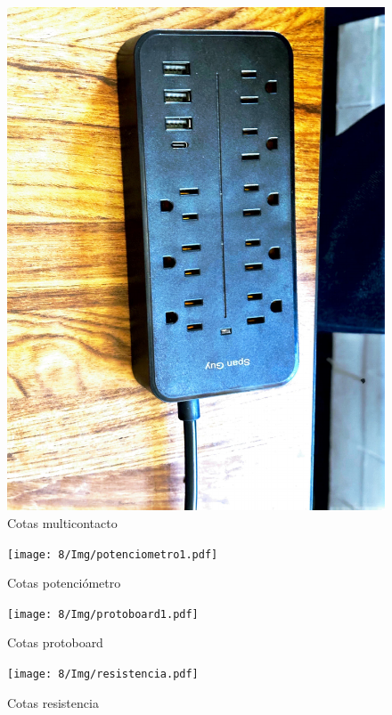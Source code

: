     
    \begin{figure}[H]
        \centering
        \includegraphics[trim = {1mm 1mm 1mm 1mm},clip,scale=0.3]{8/Img/multicontacto.pdf}
        \caption{Cotas multicontacto}
        \label{Cotas multicontacto}
    \end{figure}
    
    
    \begin{figure}[H]
        \centering
        \texttt{[image: 8/Img/potenciometro1.pdf]}
        \caption{Cotas potenciómetro}
        \label{Cotas potenciometro}
    \end{figure}
    
    
    \begin{figure}[H]
        \centering
        \texttt{[image: 8/Img/protoboard1.pdf]}
        \caption{Cotas protoboard}
        \label{Cotas protoboard}
    \end{figure}
    
    
    \begin{figure}[H]
        \centering
        \texttt{[image: 8/Img/resistencia.pdf]}
        \caption{Cotas resistencia}
        \label{Cotas resistencia}
    \end{figure}
